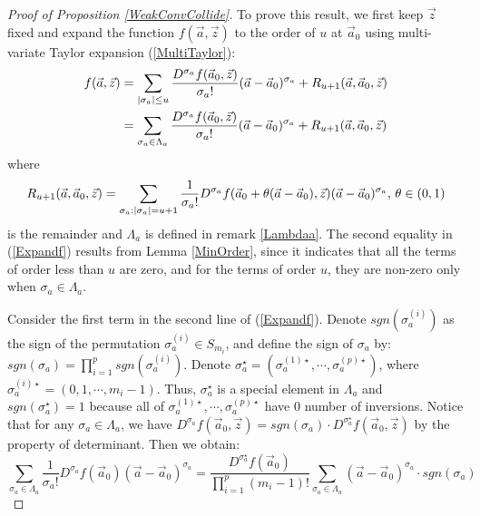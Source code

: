 \begin{proof}[Proof of Proposition \ref{WeakConvCollide}]
To prove this result, we first keep $\vec{z}$ fixed and expand the function $f(\vec{a},\vec{z})$ to the order of $u$ at $\vec{a}_{0}$ using multi-variate Taylor expansion (\ref{MultiTaylor}):
\begin{equation}{\label{Expandf}}
	\begin{split}
		f(\vec{a},\vec{z})&=\sum_{|\sigma_{a}|\leq u}\frac{D^{\sigma_{a}}f(\vec{a}_{0},\vec{z})}{\sigma_{a}!}(\vec{a}-\vec{a}_{0})^{\sigma_{a}}+R_{u+1}(\vec{a},\vec{a}_{0},\vec{z})\\
	&= \sum_{\sigma_{a}\in \Lambda_{a}}\frac{D^{\sigma_{a}}f(\vec{a}_{0},\vec{z})}{\sigma_{a}!}(\vec{a}-\vec{a}_{0})^{\sigma_{a}}+R_{u+1}(\vec{a},\vec{a}_{0},\vec{z})
	\end{split}
\end{equation}
where 
\begin{equation}{\label{remainder}}
	R_{u+1}(\vec{a},\vec{a}_{0},\vec{z})=\sum_{\sigma_{a}:|\sigma_{a}|=u+1}\frac{1}{\sigma_{a}!}D^{\sigma_{a}}f(\vec{a}_{0}+\theta(\vec{a}-\vec{a}_{0}),\vec{z})(\vec{a}-\vec{a}_{0})^{\sigma_{a}}\text{, }\theta\in(0,1)
\end{equation} 
is the remainder and $\Lambda_{a}$ is defined in remark \ref{Lambdaa}. The second equality in (\ref{Expandf}) results from Lemma \ref{MinOrder}, since it indicates that all the terms of order less than $u$ are zero, and for the terms of order $u$, they are non-zero only when $\sigma_{a}\in\Lambda_{a}$.

Consider the first term in the second line of (\ref{Expandf}). Denote $sgn(\sigma_{a}^{(i)})$ as the sign of the permutation $\sigma_{a}^{(i)}\in S_{m_i}$, and define the sign of $\sigma_{a}$ by: $sgn(\sigma_{a})=\prod_{i=1}^{p}sgn(\sigma_{a}^{(i)})$. Denote $\sigma_{a}^{\star}=\left(\sigma_{a}^{(1)\star},\cdots,\sigma_{a}^{(p)\star}\right)$, where $\sigma_{a}^{(i)\star}=(0,1,\cdots,m_i-1)$. Thus, $\sigma_{a}^{\star}$ is a special element in $\Lambda_{a}$ and $sgn(\sigma_{a}^{\star})=1$ because all of $\sigma_{a}^{(1)\star},\cdots,\sigma_{a}^{(p)\star}$ have $0$ number of inversions. Notice that for any $\sigma_{a}\in\Lambda_{a}$, we have $D^{\sigma_{a}}f(\vec{a}_{0},\vec{z})=sgn(\sigma_{a})\cdot D^{\sigma_{a}^{\star}}f(\vec{a}_{0},\vec{z})$ by the property of determinant. Then we obtain:
\begin{equation*}
	\sum_{\sigma_{a}\in\Lambda_{a}}\frac{1}{\sigma_{a}!}D^{\sigma_{a}}f(\vec{a}_{0})(\vec{a}-\vec{a}_{0})^{\sigma_{a}}=\frac{D^{\sigma_{a}^{\star}}f(\vec{a}_{0})}{\prod_{i=1}^{p}(m_{i}-1)!}\sum_{\sigma_{a}\in\Lambda_{a}}(\vec{a}-\vec{a}_{0})^{\sigma_{a}}\cdot sgn(\sigma_{a})
\end{equation*}


\end{proof}
